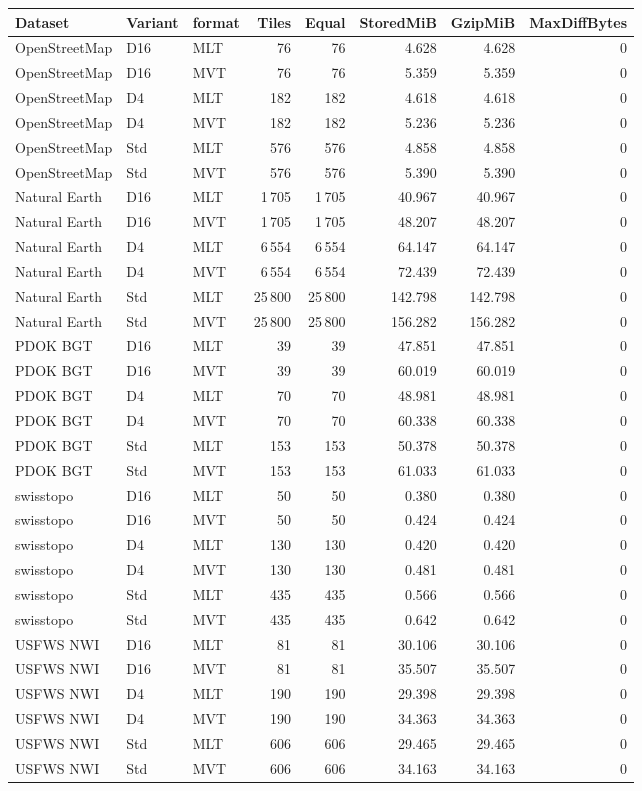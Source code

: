 \begingroup\small\setlength{\tabcolsep}{3pt}
\begin{longtable}{lllrrrrr}
\toprule
Dataset & Variant & format & Tiles & Equal & StoredMiB & GzipMiB & MaxDiffBytes \\
\midrule
OpenStreetMap & D16 & MLT & 76 & 76 & 4.628 & 4.628 & 0 \\
OpenStreetMap & D16 & MVT & 76 & 76 & 5.359 & 5.359 & 0 \\
OpenStreetMap & D4 & MLT & 182 & 182 & 4.618 & 4.618 & 0 \\
OpenStreetMap & D4 & MVT & 182 & 182 & 5.236 & 5.236 & 0 \\
OpenStreetMap & Std & MLT & 576 & 576 & 4.858 & 4.858 & 0 \\
OpenStreetMap & Std & MVT & 576 & 576 & 5.390 & 5.390 & 0 \\
Natural Earth & D16 & MLT & 1\,705 & 1\,705 & 40.967 & 40.967 & 0 \\
Natural Earth & D16 & MVT & 1\,705 & 1\,705 & 48.207 & 48.207 & 0 \\
Natural Earth & D4 & MLT & 6\,554 & 6\,554 & 64.147 & 64.147 & 0 \\
Natural Earth & D4 & MVT & 6\,554 & 6\,554 & 72.439 & 72.439 & 0 \\
Natural Earth & Std & MLT & 25\,800 & 25\,800 & 142.798 & 142.798 & 0 \\
Natural Earth & Std & MVT & 25\,800 & 25\,800 & 156.282 & 156.282 & 0 \\
PDOK BGT & D16 & MLT & 39 & 39 & 47.851 & 47.851 & 0 \\
PDOK BGT & D16 & MVT & 39 & 39 & 60.019 & 60.019 & 0 \\
PDOK BGT & D4 & MLT & 70 & 70 & 48.981 & 48.981 & 0 \\
PDOK BGT & D4 & MVT & 70 & 70 & 60.338 & 60.338 & 0 \\
PDOK BGT & Std & MLT & 153 & 153 & 50.378 & 50.378 & 0 \\
PDOK BGT & Std & MVT & 153 & 153 & 61.033 & 61.033 & 0 \\
swisstopo & D16 & MLT & 50 & 50 & 0.380 & 0.380 & 0 \\
swisstopo & D16 & MVT & 50 & 50 & 0.424 & 0.424 & 0 \\
swisstopo & D4 & MLT & 130 & 130 & 0.420 & 0.420 & 0 \\
swisstopo & D4 & MVT & 130 & 130 & 0.481 & 0.481 & 0 \\
swisstopo & Std & MLT & 435 & 435 & 0.566 & 0.566 & 0 \\
swisstopo & Std & MVT & 435 & 435 & 0.642 & 0.642 & 0 \\
USFWS NWI & D16 & MLT & 81 & 81 & 30.106 & 30.106 & 0 \\
USFWS NWI & D16 & MVT & 81 & 81 & 35.507 & 35.507 & 0 \\
USFWS NWI & D4 & MLT & 190 & 190 & 29.398 & 29.398 & 0 \\
USFWS NWI & D4 & MVT & 190 & 190 & 34.363 & 34.363 & 0 \\
USFWS NWI & Std & MLT & 606 & 606 & 29.465 & 29.465 & 0 \\
USFWS NWI & Std & MVT & 606 & 606 & 34.163 & 34.163 & 0 \\
\bottomrule
\end{longtable}
\endgroup
